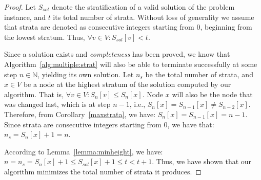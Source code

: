 \begin{proof}
  Let $S_{sol}$ denote the stratification of a valid solution of the
  problem instance, and $t$ its total number of strata. Without loss
  of generality we assume that strata are denoted as consecutive
  integers starting from $0$, beginning from the lowest stratum. Thus,
  $\forall v \in V : S_{sol}[v] < t$.

  Since a solution exists and \emph{completeness} has been proved, we
  know that Algorithm~\ref{alg:multiple:strat} will also be able to
  terminate successfully at some step $n \in \mathbb{N}$, yielding its
  own solution. Let $n_{s}$ be the total number of strata, and $x \in
  V$ be a node at the highest stratum of the solution computed by our
  algorithm. That is, $\forall v \in V : S_{n}[v] \leq S_{n}[x]$. Node
  $x$ will also be the node that was changed last, which is at
  step $n-1$, i.e., $S_n[x] = S_{n-1}[x] \neq S_{n-2}[x]$. Therefore,
  from Corollary~\ref{maxstrata}, we have: $S_n[x] = S_{n-1}[x] = n -
  1$. Since strata are consecutive integers starting from $0$, we have
  that: $n_{s} = S_n[x] + 1 = n$.

  According to Lemma~\ref{lemma:minheight}, we have: $n = n_{s} =
  S_n[x] + 1 \leq S_{sol}[x] + 1 \leq t < t + 1$. Thus, we have shown
  that our algorithm minimizes the total number of strata it produces.
\end{proof}
